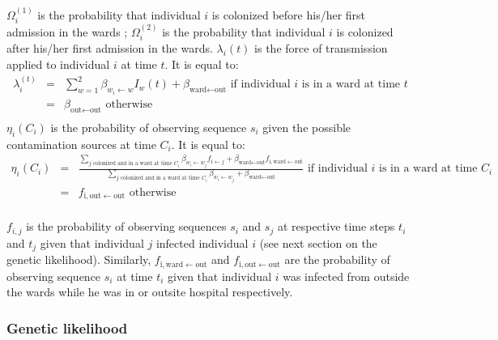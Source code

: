 \documentclass[10pt]{article}
\begin{document}
$\Omega_i^{\left(1\right)}$ is the probability that individual $i$ is colonized before his/her first admission in the wards ; $\Omega_i^{\left(2\right)}$ is the probability that individual $i$ is colonized after his/her first admission in the wards. 
$\lambda_i\left(t\right)$ is the force of transmission applied to individual $i$ at time $t$. It is equal to: 
\begin{eqnarray*}
\lambda_i^{\left(t\right)} & = & \sum_{w=1}^{2} \beta_{w_i \leftarrow w} I_w\left(t\right) + \beta_{\text{ward} \leftarrow \text{out}} \text{ if individual $i$ is in a ward at time $t$}  \\
 & = & \beta_{\text{out} \leftarrow \text{out}} \text{ otherwise}\\
\end{eqnarray*}
\bigskip
$\eta_i\left(C_i\right)$ is the probability of observing sequence $s_i$ given the possible contamination sources at time $C_i$. It is equal to: 
\begin{eqnarray*}
\eta_i\left(C_i\right) & = & \frac{\sum_{\text{$j$ colonized and in a ward at time $C_i$}} \beta_{w_i \leftarrow w_j} f_{i \leftarrow j} + \beta_{\text{ward} \leftarrow \text{out}}f_{\text{i},\text{ward} \leftarrow \text{out}} }{\sum_{\text{$j$ colonized and in a ward at time $C_i$}} \beta_{w_i \leftarrow w_j} + \beta_{\text{ward} \leftarrow \text{out}} } \text{ if individual $i$ is in a ward at time $C_i$}  \\
 & = & f_{\text{i},\text{out} \leftarrow \text{out}} \text{ otherwise}\\
\end{eqnarray*}
\bigskip

$f_{i,j}$ is the probability of observing sequences $s_i$ and $s_j$ at respective time steps $t_i$ and $t_j$ given that individual $j$ infected individual $i$ (see next section on the genetic likelihood). Similarly, $f_{\text{i},\text{ward} \leftarrow \text{out}}$ and $f_{\text{i},\text{out} \leftarrow \text{out}}$ are the probability of observing sequence $s_i$ at time $t_i$ given that individual $i$ was infected from outside the wards while he was in or outsite hospital respectively. 


\subsubsection*{Genetic likelihood}

\end{document}
